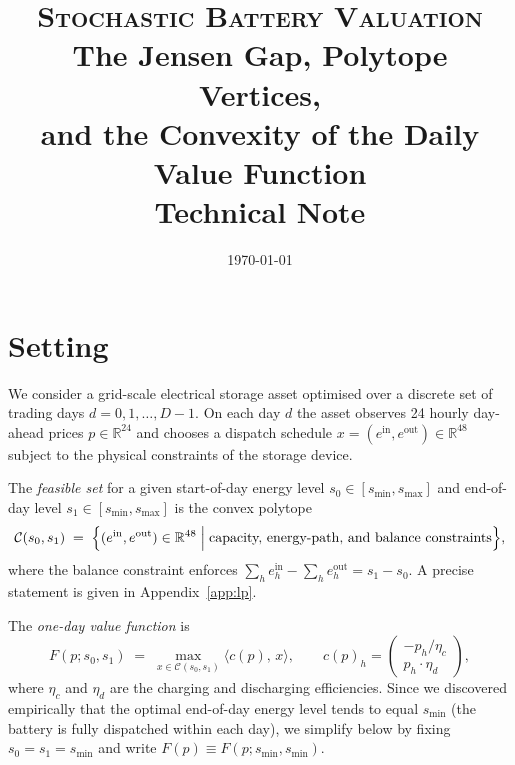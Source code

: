 \documentclass[11pt, a4paper]{article}
\theoremstyle{plain}
\theoremstyle{definition}
\newcommand{\R}{\mathbb{R}}
\newcommand{\C}{\mathcal{C}}
\begin{document}

\title{%
  \large\textsc{Stochastic Battery Valuation}\\[0.4em]
  \LARGE\textbf{The Jensen Gap, Polytope Vertices,\\[0.2em]
  and the Convexity of the Daily Value Function}\\[0.5em]
  \normalsize Technical Note
}
\author{}
\date{\today}
\maketitle
\tableofcontents
\newpage

\section{Setting}

We consider a grid-scale electrical storage asset optimised over a
discrete set of trading days $d = 0, 1, \ldots, D{-}1$.
On each day $d$ the asset observes 24 hourly day-ahead prices
$p \in \R^{24}$ and chooses a dispatch schedule
$x = (e^{\mathrm{in}}, e^{\mathrm{out}}) \in \R^{48}$
subject to the physical constraints of the storage device.

The \emph{feasible set} for a given start-of-day energy level
$s_0 \in [s_{\min}, s_{\max}]$ and end-of-day level
$s_1 \in [s_{\min}, s_{\max}]$ is the convex polytope
\begin{equation}
  \C(s_0, s_1)
  \;=\;
  \Bigl\{
    (e^{\mathrm{in}}, e^{\mathrm{out}}) \in \R^{48}
    \;\Big|\;
    \text{capacity, energy-path, and balance constraints}
  \Bigr\},
  \label{eq:feasible}
\end{equation}
where the balance constraint enforces
$\sum_h e^{\mathrm{in}}_h - \sum_h e^{\mathrm{out}}_h = s_1 - s_0$.
A precise statement is given in Appendix~\ref{app:lp}.

The \emph{one-day value function} is
\begin{equation}
  F(p; s_0, s_1)
  \;=\;
  \max_{x \in \C(s_0, s_1)}
  \langle c(p),\, x \rangle,
  \qquad
  c(p)_h
  =
  \begin{pmatrix}
    -p_h / \eta_c \\
    p_h \cdot \eta_d
  \end{pmatrix},
  \label{eq:F}
\end{equation}
where $\eta_c$ and $\eta_d$ are the charging and discharging efficiencies.
Since we discovered empirically that the optimal end-of-day energy level
tends to equal $s_{\min}$ (the battery is fully dispatched within each day),
we simplify below by fixing $s_0 = s_1 = s_{\min}$ and write
$F(p) \equiv F(p; s_{\min}, s_{\min})$.
\end{document}
